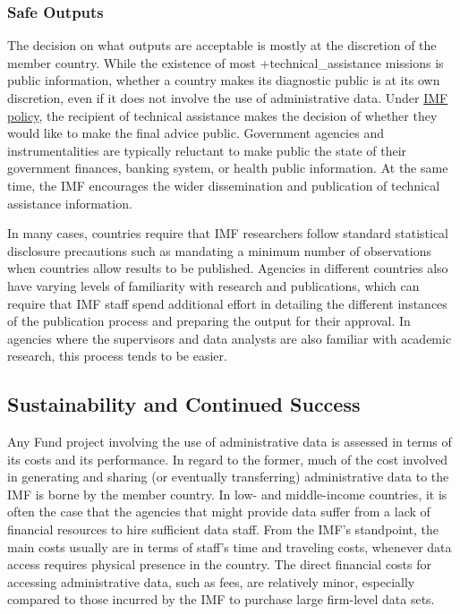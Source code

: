 \documentclass[
]{WileySix}
\begin{document}
\hypertarget{safe-outputs-8}{%
\subsubsection{Safe Outputs}\label{safe-outputs-8}}

The decision on what outputs are acceptable is mostly at the discretion of the member country. While the existence of most +technical\_assistance\textbar{} missions is public information, whether a country makes its diagnostic public is at its own discretion, even if it does not involve the use of administrative data. Under \href{https://www.imf.org/external/np/pp/eng/2013/061013.pdf}{IMF policy}, the recipient of technical assistance makes the decision of whether they would like to make the final advice public. Government agencies and instrumentalities are typically reluctant to make public the state of their government finances, banking system, or health public information. At the same time, the IMF encourages the wider dissemination and publication of technical assistance information.

In many cases, countries require that IMF researchers follow standard statistical disclosure precautions such as mandating a minimum number of observations when countries allow results to be published. Agencies in different countries also have varying levels of familiarity with research and publications, which can require that IMF staff spend additional effort in detailing the different instances of the publication process and preparing the output for their approval. In agencies where the supervisors and data analysts are also familiar with academic research, this process tends to be easier.

\hypertarget{sustainability-and-continued-success-8}{%
\subsection{Sustainability and Continued Success}\label{sustainability-and-continued-success-8}}

Any Fund project involving the use of administrative data is assessed in terms of its costs and its performance. In regard to the former, much of the cost involved in generating and sharing (or eventually transferring) administrative data to the IMF is borne by the member country. In low- and middle-income countries, it is often the case that the agencies that might provide data suffer from a lack of financial resources to hire sufficient data staff. From the IMF's standpoint, the main costs usually are in terms of staff's time and traveling costs, whenever data access requires physical presence in the country. The direct financial costs for accessing administrative data, such as fees, are relatively minor, especially compared to those incurred by the IMF to purchase large firm-level data sets.
\end{document}
